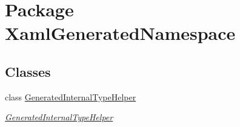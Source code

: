 \hypertarget{namespace_xaml_generated_namespace}{\section{Package Xaml\+Generated\+Namespace}
\label{namespace_xaml_generated_namespace}
}
\subsection*{Classes}
\begin{DoxyCompactItemize}
\item 
class \hyperlink{class_xaml_generated_namespace_1_1_generated_internal_type_helper}{Generated\+Internal\+Type\+Helper}
\begin{DoxyCompactList}\small\item\em \hyperlink{class_xaml_generated_namespace_1_1_generated_internal_type_helper}{Generated\+Internal\+Type\+Helper} \end{DoxyCompactList}\end{DoxyCompactItemize}
